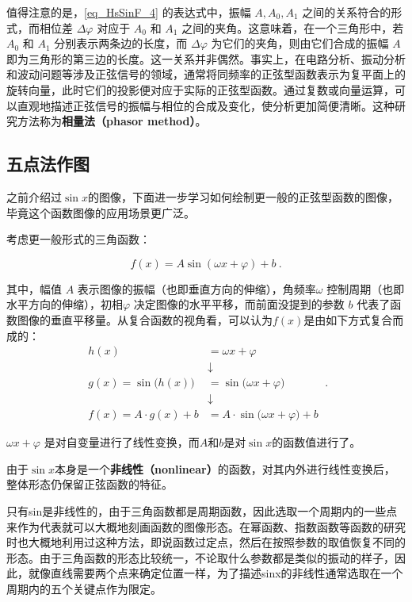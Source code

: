 值得注意的是，\autoref{eq_HsSinF_4} 的表达式中，振幅 $A, A_0, A_1$ 之间的关系符合的形式，而相位差 $\Delta \varphi$ 对应于 $A_0$ 和 $A_1$ 之间的夹角。这意味着，在一个三角形中，若 $A_0$ 和 $A_1$ 分别表示两条边的长度，而 $\Delta \varphi$ 为它们的夹角，则由它们合成的振幅 $A$ 即为三角形的第三边的长度。这一关系并非偶然。事实上，在电路分析、振动分析和波动问题等涉及正弦信号的领域，通常将同频率的正弦型函数表示为复平面上的旋转向量，此时它们的投影便对应于实际的正弦型函数。通过复数或向量运算，可以直观地描述正弦信号的振幅与相位的合成及变化，使分析更加简便清晰。这种研究方法称为\textbf{相量法（phasor method）}。

\subsection{五点法作图}

之前介绍过$\sin x$的图像，下面进一步学习如何绘制更一般的正弦型函数的图像，毕竟这个函数图像的应用场景更广泛。

考虑更一般形式的三角函数：

\begin{equation}
f(x) = A \sin(\omega x + \varphi) + b~.
\end{equation}

其中，幅值 $A$ 表示图像的振幅（也即垂直方向的伸缩），角频率$\omega$ 控制周期（也即水平方向的伸缩），初相$\varphi$ 决定图像的水平平移，而前面没提到的参数 $b$ 代表了函数图像的垂直平移量。从复合函数的视角看，可以认为$f(x)$是由如下方式复合而成的：
\begin{equation}
\begin{split}
h(x) &= \omega x + \varphi \\
&\downarrow\\
g(x) = \sin\big(h(x)\big) &= \sin\big(\omega x + \varphi\big) \\
&\downarrow\\
f(x) = A \cdot g(x) + b &= A \cdot \sin\big(\omega x + \varphi\big) + b
\end{split}~.
\end{equation}


$\omega x + \varphi$ 是对自变量进行了线性变换，而$A$和$b$是对$\sin x$的函数值进行了。

由于$\sin x$本身是一个\textbf{非线性（nonlinear）}的函数，对其内外进行线性变换后，整体形态仍保留正弦函数的特征。


只有sin是非线性的，由于三角函数都是周期函数，因此选取一个周期内的一些点来作为代表就可以大概地刻画函数的图像形态。在幂函数、指数函数等函数的研究时也大概地利用过这种方法，即说函数过定点，然后在按照参数的取值恢复不同的形态。由于三角函数的形态比较统一，不论取什么参数都是类似的振动的样子，因此，就像直线需要两个点来确定位置一样，为了描述sinx的非线性通常选取在一个周期内的五个关键点作为限定。

